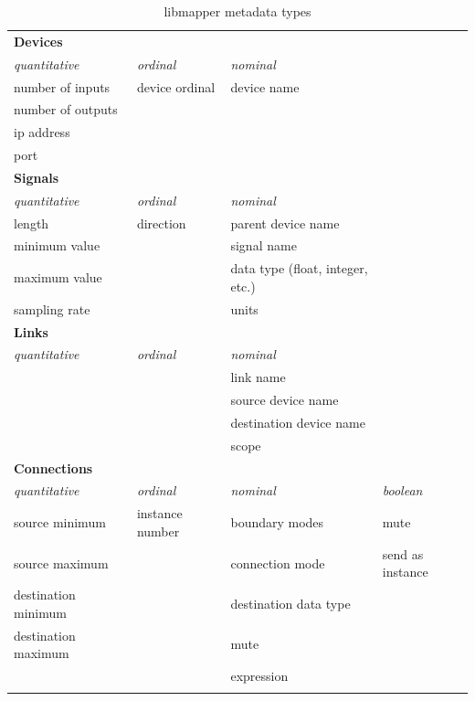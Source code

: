 \begin{longtable}{l l l l}
\caption[libmapper metadata types]{libmapper metadata types} \label{tab:metadata_types} \\

	\hline\hline
	\textbf{Devices} & & \\
	\emph{quantitative} & \emph{ordinal} & \emph{nominal}\\
	\hline
	number of inputs & device ordinal & device name\\
		number of outputs \\
	ip address \\
	port \\ [0.7cm]

	\hline\hline
	\textbf{Signals} & & \\
	\emph{quantitative} & \emph{ordinal} & \emph{nominal}\\
	\hline
	length & direction & parent device name\\
	minimum value & & signal name \\
	maximum value & & data type (float, integer, etc.)\\
	sampling rate & & units \\ [0.7cm]

	\hline\hline
	\textbf{Links} & & \\
	\emph{quantitative} & \emph{ordinal} & \emph{nominal}\\
	\hline
	& & link name \\
	& & source device name \\
	& & destination device name \\
	& & scope \\ [0.7cm]

	\hline\hline
	\textbf{Connections} & & \\
	\emph{quantitative} & \emph{ordinal} & \emph{nominal} & \emph{boolean}\\
	\hline
	source minimum & instance number & boundary modes & mute\\
	source maximum & & connection mode & send as instance\\
	destination minimum & & destination data type \\
	destination maximum & & mute \\
	& & expression \\
	& & \\
\end{longtable}


